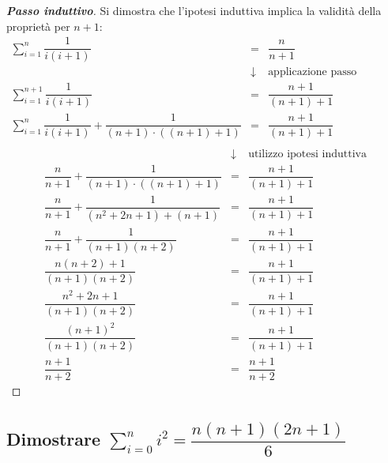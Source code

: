 \documentclass[a4paper]{article}
\begin{document}
	\begin{proof}[\textbf{Passo induttivo}]
		Si dimostra che l'ipotesi induttiva implica la validità della proprietà per $n + 1$:
		\begin{equation*}
			\begin{array}{rcl}
				\displaystyle\sum_{i=1}^{n}\dfrac{1}{i\left(i+1\right)} &=& \dfrac{n}{n+1} \\ [1.5em]
				&\downarrow& \text{applicazione passo induttivo} \\ [.5em]
				\displaystyle\sum_{i=1}^{n+1}\dfrac{1}{i\left(i+1\right)} &=& \dfrac{n+1}{\left(n+1\right)+1} \\ [1.5em]
				\displaystyle\sum_{i=1}^{n}\dfrac{1}{i\left(i+1\right)} + \dfrac{1}{\left(n+1\right)\cdot\left(\left(n+1\right) + 1\right)} &=& \dfrac{n+1}{\left(n+1\right)+1} \\ [1.5em]
			\end{array}
		\end{equation*}\newpage
		\begin{equation*}
			\begin{array}{rcl}
				&\downarrow& \text{utilizzo ipotesi induttiva} \\ [.5em]
				\dfrac{n}{n+1} + \dfrac{1}{\left(n+1\right)\cdot\left(\left(n+1\right) + 1\right)} &=& \dfrac{n+1}{\left(n+1\right)+1} \\ [1.5em]
				\dfrac{n}{n+1} + \dfrac{1}{\left(n^{2} + 2n + 1\right) + \left(n+1\right)} &=& \dfrac{n+1}{\left(n+1\right)+1} \\ [1.5em]
				\dfrac{n}{n+1} + \dfrac{1}{\left(n+1\right)\left(n+2\right)} &=& \dfrac{n+1}{\left(n+1\right)+1} \\ [1.5em]
				\dfrac{n\left(n+2\right) + 1}{\left(n+1\right)\left(n+2\right)} &=& \dfrac{n+1}{\left(n+1\right)+1} \\ [1.5em]
				\dfrac{n^{2} + 2n + 1}{\left(n+1\right)\left(n+2\right)} &=& \dfrac{n+1}{\left(n+1\right)+1} \\ [1.5em]
				\dfrac{\left(n+1\right)^{2}}{\left(n+1\right)\left(n+2\right)} &=& \dfrac{n+1}{\left(n+1\right)+1} \\ [1.5em]
				\dfrac{n+1}{n+2} &=& \dfrac{n+1}{n+2}
			\end{array}
		\end{equation*}
	\end{proof}\newpage
	
	\subsection{Dimostrare $\displaystyle\sum_{i=0}^{n} i^{2} = \dfrac{n\left(n+1\right)\left(2n+1\right)}{6}$}
	
\end{document}
